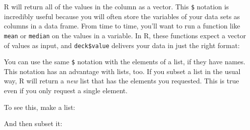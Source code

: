 \documentclass[
  letterpaper,
  DIV=11,
  numbers=noendperiod]{scrbook}
\newenvironment{Shaded}{\begin{snugshade}}{\end{snugshade}}
\newcommand{\AttributeTok}[1]{\textcolor[rgb]{0.40,0.45,0.13}{#1}}
\newcommand{\ConstantTok}[1]{\textcolor[rgb]{0.56,0.35,0.01}{#1}}
\newcommand{\DecValTok}[1]{\textcolor[rgb]{0.68,0.00,0.00}{#1}}
\newcommand{\DocumentationTok}[1]{\textcolor[rgb]{0.37,0.37,0.37}{\textit{#1}}}
\newcommand{\FunctionTok}[1]{\textcolor[rgb]{0.28,0.35,0.67}{#1}}
\newcommand{\NormalTok}[1]{\textcolor[rgb]{0.00,0.23,0.31}{#1}}
\newcommand{\OtherTok}[1]{\textcolor[rgb]{0.00,0.23,0.31}{#1}}
\newcommand{\SpecialCharTok}[1]{\textcolor[rgb]{0.37,0.37,0.37}{#1}}
\newcommand{\StringTok}[1]{\textcolor[rgb]{0.13,0.47,0.30}{#1}}
\begin{document}
R will return all of the values in the column as a vector. This
\texttt{\$} notation is incredibly useful because you will often store
the variables of your data sets as columns in a data frame. From time to
time, you'll want to run a function like \texttt{mean} or
\texttt{median} on the values in a variable. In R, these functions
expect a vector of values as input, and \texttt{deck\$value} delivers
your data in just the right format:

\begin{Shaded}
\end{Shaded}

You can use the same \texttt{\$} notation with the elements of a list,
if they have names. This notation has an advantage with lists, too. If
you subset a list in the usual way, R will return a \emph{new} list that
has the elements you requested. This is true even if you only request a
single element.

To see this, make a list:

\begin{Shaded}
\end{Shaded}

And then subset it:

\begin{Shaded}
\end{Shaded}
\end{document}
